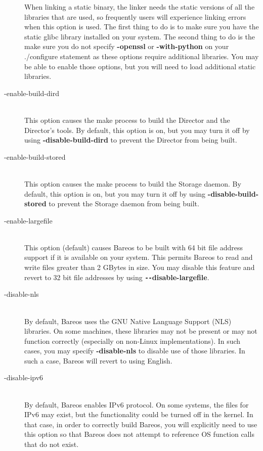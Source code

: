 \begin{description}
When linking a static binary, the linker needs the static versions
of all the libraries that are used, so frequently users will
experience linking errors when this option is used. The first
thing to do is to make sure you have the static glibc library
installed on your system. The second thing to do is the make sure
you do not specify {\bf {-}{\-}openssl} or {\bf {-}{\-}with-python}
on your ./configure statement as these options require additional
libraries. You may be able to enable those options, but you will
need to load additional static libraries.

\item [ {-}{\-}enable-build-dird] \hfill \\
This option causes the make process to build the Director and the
Director's tools. By default, this option is on, but you may turn
it off by using {\bf {-}{\-}disable-build-dird} to prevent the
Director from being built.

\item [ {-}{\-}enable-build-stored] \hfill \\
This option causes the make process to build the Storage daemon.
By default, this option is on, but you may turn
it off by using {\bf {-}{\-}disable-build-stored} to prevent the
Storage daemon from being built.

\item [ {-}{\-}enable-largefile] \hfill \\
This option (default) causes  Bareos to be built with 64 bit file address
support if it  is available on your system. This permits Bareos to read and
write files greater than 2 GBytes in size. You may disable this  feature and
revert to 32 bit file addresses by using  {\bf \verb:--:disable-largefile}.

\item [ {-}{\-}disable-nls] \hfill \\
By default, Bareos uses the GNU Native Language Support (NLS) libraries. On
some machines, these libraries may not be present or may not function
correctly (especially on non-Linux implementations). In such cases, you
may specify {\bf {-}{\-}disable-nls} to disable use of those libraries.
In such a case, Bareos will revert to using English.

\item [ {-}{\-}disable-ipv6] \hfill \\
By default, Bareos enables IPv6 protocol. On some systems, the files
for IPv6 may exist, but the functionality could be turned off in the
kernel. In that case, in order to correctly build Bareos, you will
explicitly need to use this option so that Bareos does not attempt
to reference OS function calls that do not exist.


\end{description}
